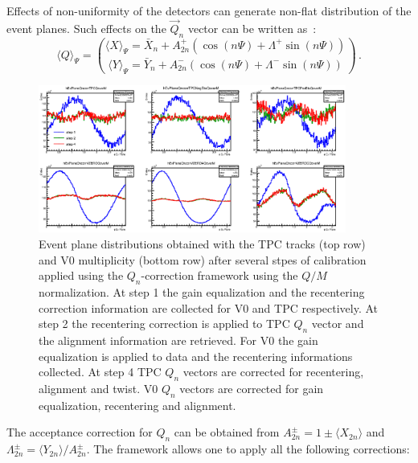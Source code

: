 Effects of non-uniformity of the detectors can generate 
non-flat distribution of the event planes. Such effects on the 
$\vec{Q}_n$ vector can be written as~\cite{Selyuzhenkov:2007zi}:
\begin{equation}
\langle Q \rangle_{\Psi}={\langle X \rangle_{\Psi} =\bar{X}_n+A^+_{2n}(\cos
  (n\Psi)+\Lambda^+\sin (n\Psi))\choose \langle Y \rangle_{\Psi} =\bar{Y}_n+A^-_{2n}(\cos
  (n\Psi)+\Lambda^-\sin (n\Psi))}\,.
\end{equation}
\begin{figure}
\centering
 \includegraphics[width=0.9\textwidth]{FigCap5/EP_overMnorm.eps}
 \caption{Event plane distributions obtained with the TPC tracks (top row) and V0 multiplicity (bottom row) after several stpes of calibration applied using the $Q_n$-correction framework using the $Q/M$ normalization. At step 1 the gain equalization and the
   recentering correction
   information are collected for V0 and TPC respectively. At
   step 2 the recentering correction is applied to TPC $Q_n$ vector
   and the alignment information are retrieved. For V0 the gain
   equalization is applied to data and the recentering informations
   collected. At step 4 TPC $Q_n$ vectors are corrected for
   recentering, alignment and twist. V0 $Q_n$ vectors are corrected
   for gain equalization, recentering
   and alignment.}
   \label{fig:QoverMCalibration}
\end{figure}
The acceptance correction for $Q_n$ can be obtained from
$A^{\pm}_{2n}=1\pm \langle X_{2n} \rangle$ and $\Lambda^{\pm}_{2n}=
\langle Y_{2n} \rangle/A^{\pm}_{2n}$. The framework allows one to apply all the following corrections:
